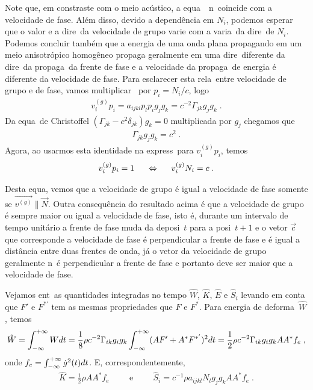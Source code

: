 Note que, em constraste com o meio ac\'ustico, a
equa\cao\ \ n\ao\ coincide com a
velocidade de fase. Al\'em disso, devido a
depend\^encia em $N_i$, podemos esperar que o valor
e a dire\cao\ da velocidade de grupo varie com a
varia\cao\ da dire\cao\ de $N_i$. Podemos concluir
tamb\'em que a energia de uma onda plana propagando
em um meio anisotr\'opico homog\^eneo propaga 
geralmente em uma dire\cao\ diferente da dire\cao\
da propaga\cao\ da frente de fase e a velocidade
da propaga\cao\ de energia \'e diferente da
velocidade de fase. Para esclarecer esta rela\cao\
entre velocidade de grupo e de fase, vamos
multiplicar \refi{vgmah}\ por $p_i=N_i/c$, logo
\begin{eqnarray}
v_i^{(g)} p_i = a_{ijkl} p_l p_i g_j g_k = c^{-2}
\Gamma_{jk} g_j g_k \; . 
\end{eqnarray}
Da equa\cao\ de Christoffel
$(\Gamma_{jk}-c^2 \delta_{jk})g_k = 0$
multiplicada por $g_j$ chegamos que
\begin{eqnarray}
\Gamma_{jk} g_j g_k = c^2 \; .
\end{eqnarray}
Agora, ao usarmos esta identidade na express\ao\ para
$v_i^{(g)} p_i$, temos
\begin{eqnarray}
v_i^{(g)}p_i = 1 \hspace{0.5cm} \Leftrightarrow 
\hspace{0.5cm} v_i^{(g)}N_i = c \; .
\end{eqnarray}

Desta equa\cao, vemos que a velocidade de grupo \'e
igual a velocidade de fase somente se
$\vec{v^{(g)}} \parallel \vec{N}$. Outra
consequ\^encia do resultado acima \'e que a
velocidade de grupo \'e sempre maior ou igual a
velocidade de fase, isto \'e, durante um intervalo
de tempo unit\'ario a frente de fase muda da
deposi\cao\ $t$ para a posi\cao\ $t+1$ e o vetor
$\vec{c}$ que corresponde a velocidade de fase \'e
perpendicular a frente de fase e \'e igual a
dist\^ancia entre duas frentes de onda, j\'a o 
vetor da velocidade de grupo geralmente n\ao\
\'e perpendicular a frente de fase e portanto
deve ser maior que a velocidade de fase.

Vejamos ent\ao\ as quantidades integradas no tempo
$\hat{W}$, $\hat{K}$, $\hat{E}$ e $\hat{S}_i$ levando
em conta que $F'$ e $F^{*'}$ tem as mesmas
propriedades que $F$ e $F^{*}$. Para energia de 
deforma\cao\ $\hat{W}$, temos
\begin{eqnarray}
\hat{W}= \int_{-\infty}^{+\infty} W dt = \frac{1}{8}\rho c^{-2}
\Gamma_{ik} g_i g_k \int_{-\infty}^{+\infty} (AF'+ A^{*}F^{*'})^2 dt
= \frac{1}{2} \rho c^{-2} \Gamma_{ik} g_i g_k
AA^{*} f_e \; ,
\end{eqnarray}
onde $f_e = \int_{-\infty}^{+\infty} \dot{g}^2(t) dt$.
E, correspondentemente,
\begin{eqnarray}
\hat{K} = \frac{1}{2} \rho A A^{*} f_e 
\hspace{1cm} \mbox{e} \hspace{1cm}
\hat{S}_i = c^{-1} \rho a_{ijkl}
N_l g_j g_k A A^{*} f_e \; .
\end{eqnarray}

